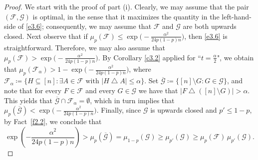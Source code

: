 \documentclass[10pt,a4paper]{amsart}
\theoremstyle{remark}
\newcommand{\meg}{\geqslant}
\newcommand{\mik}{\leqslant}
\newcommand{\Fcal}{\mathcal{F}}
\newcommand{\Gcal}{\mathcal{G}}
\begin{document}
\begin{proof}
We start with the proof of part (i). Clearly, we may assume that the pair $(\Fcal,\Gcal)$ is
optimal, in the sense that it maximizes the quantity in the left-hand-side of \eqref{e3.6};
consequently, we may assume that $\Fcal$ and $\Gcal$ are both upwards closed.
Next observe that if $\mu_{p}(\Fcal)\mik \exp\big(-\frac{\alpha^2}{24p(1-p)n}\big)$,
then \eqref{e3.6} is straightforward. Therefore, we may also assume that
$\mu_{p}(\Fcal)>\exp\big(-\frac{\alpha^2}{24p(1-p)n}\big)$. By  Corollary \ref{c3.2} applied for ``$t=\frac{\alpha}{2}$",
we obtain that $\mu_{p}(\Fcal_{\alpha})>1-\exp\big(-\frac{\alpha^2}{24p(1-p)n}\big)$, where
$\Fcal_{\alpha}\coloneqq \{H\subseteq [n]: \exists A\in\Fcal \text{ with } |H\bigtriangleup A|\mik \alpha\}$.
Set $\overline{\Gcal}\coloneqq \{[n]\setminus G:G\in\Gcal\}$, and note that for every $F\in\Fcal$ and
every $G\in\Gcal$ we have that $|F\bigtriangleup([n]\setminus G)|>\alpha$. This yields that
$\overline{\Gcal}\cap\Fcal_{\alpha}=\emptyset$, which in turn implies that  $\mu_{p}(\overline{\Gcal})<\exp\big(-\frac{\alpha^2}{24p(1-p)n}\big)$. Finally,
since $\Gcal$ is upwards closed and $p'\mik 1-p$, by Fact~\ref{f2.2}, we conclude that
\begin{equation} \label{e3.8}
\exp\left(-\frac{\alpha^2}{24p(1-p)n}\right)> \mu_{p}(\overline{\Gcal})=
\mu_{1-p}(\Gcal) \meg \mu_{p'}(\Gcal) \meg \mu_{p}(\Fcal)\, \mu_{p'}(\Gcal).
\end{equation}


\end{proof}
\end{document}
